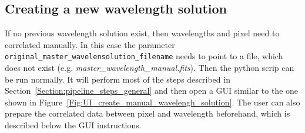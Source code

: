 \documentclass[10pt,a4paper]{article}
\begin{document}
\subsection{Creating a new wavelength solution}
\label{section:create_new_wave_solution}
If no previous wavelength solution exist, then wavelengths and pixel need to correlated manually. In this case the parameter \verb|original_master_wavelensolution_filename| needs to point to a file, which does not exist (e.g. \textit{master\_wavelength\_manual.fits}). Then the python scrip can be run normally. It will perform most of the steps described in Section~\ref{Section:pipeline_steps_general} and then open a GUI similar to the one shown in Figure~\ref{Fig:UI_create_manual_wavelengh_solution}. The user can also prepare the correlated data between pixel and wavelength beforehand, which is described below the GUI instructions.
\end{document}
